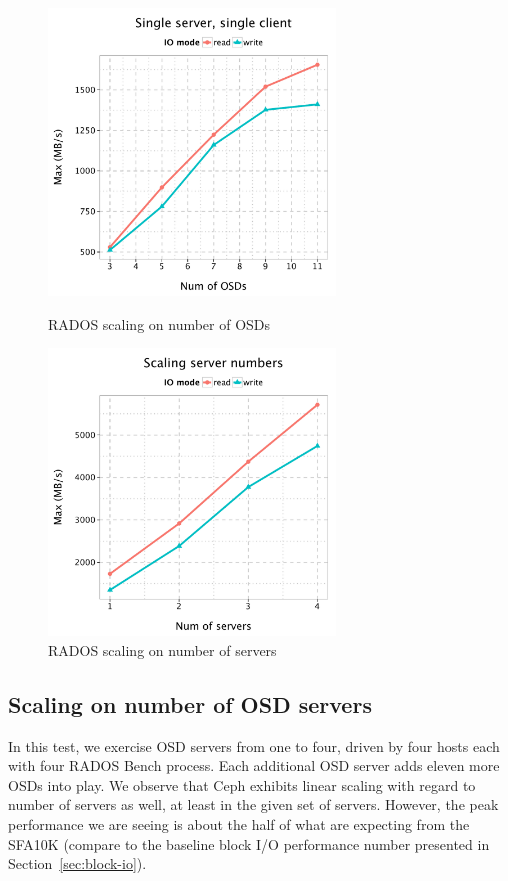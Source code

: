 \documentclass{article}
\begin{document}
\begin{figure}[H]
\centering
\begin{minipage}[t]{0.5\linewidth}
\centering
\includegraphics[width=3in]{data/rados_osd}
\caption{RADOS scaling on number of OSDs}
\label{fig:osd-scale}
\end{minipage}%
\begin{minipage}[t]{0.5\linewidth}
\centering
\includegraphics[width=3in]{data/rados_server}
\caption{RADOS scaling on number of servers}
\label{fig:oss-scale}
\end{minipage}%
\end{figure}

\subsection{Scaling on number of OSD servers}

In this test, we exercise OSD servers from one to four, driven by four hosts
each with four RADOS Bench process. Each additional OSD server
adds eleven more OSDs into play. We observe that Ceph exhibits linear scaling with
regard to number of servers as well, at least in the given set of servers.
However, the peak performance we are seeing is about the half of what are
expecting from the SFA10K (compare to the baseline block I/O performance number
presented in Section~\ref{sec:block-io}).
\end{document}

